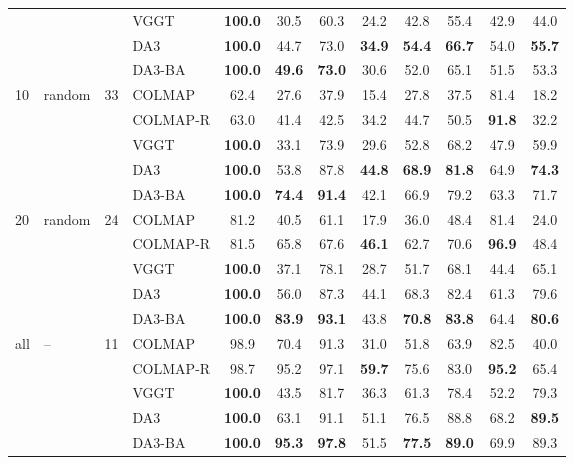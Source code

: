 \begin{tabular}{llr lcccccccc}
 & &  & VGGT & \textbf{100.0} & 30.5 & 60.3 & 24.2 & 42.8 & 55.4 & 42.9 & 44.0 \\
 & &  & DA3 & \textbf{100.0} & 44.7 & 73.0 & \textbf{34.9} & \textbf{54.4} & \textbf{66.7} & 54.0 & \textbf{55.7} \\
 & &  & DA3-BA & \textbf{100.0} & \textbf{49.6} & \textbf{73.0} & 30.6 & 52.0 & 65.1 & 51.5 & 53.3 \\
\midrule
\multirow{5}{*}{10} & \multirow{5}{*}{random} & \multirow{5}{*}{33} & COLMAP & 62.4 & 27.6 & 37.9 & 15.4 & 27.8 & 37.5 & 81.4 & 18.2 \\
 & &  & COLMAP-R & 63.0 & 41.4 & 42.5 & 34.2 & 44.7 & 50.5 & \textbf{91.8} & 32.2 \\
 & &  & VGGT & \textbf{100.0} & 33.1 & 73.9 & 29.6 & 52.8 & 68.2 & 47.9 & 59.9 \\
 & &  & DA3 & \textbf{100.0} & 53.8 & 87.8 & \textbf{44.8} & \textbf{68.9} & \textbf{81.8} & 64.9 & \textbf{74.3} \\
 & &  & DA3-BA & \textbf{100.0} & \textbf{74.4} & \textbf{91.4} & 42.1 & 66.9 & 79.2 & 63.3 & 71.7 \\
\midrule
\multirow{5}{*}{20} & \multirow{5}{*}{random} & \multirow{5}{*}{24} & COLMAP & 81.2 & 40.5 & 61.1 & 17.9 & 36.0 & 48.4 & 81.4 & 24.0 \\
 & &  & COLMAP-R & 81.5 & 65.8 & 67.6 & \textbf{46.1} & 62.7 & 70.6 & \textbf{96.9} & 48.4 \\
 & &  & VGGT & \textbf{100.0} & 37.1 & 78.1 & 28.7 & 51.7 & 68.1 & 44.4 & 65.1 \\
 & &  & DA3 & \textbf{100.0} & 56.0 & 87.3 & 44.1 & 68.3 & 82.4 & 61.3 & 79.6 \\
 & &  & DA3-BA & \textbf{100.0} & \textbf{83.9} & \textbf{93.1} & 43.8 & \textbf{70.8} & \textbf{83.8} & 64.4 & \textbf{80.6} \\
\midrule
\multirow{5}{*}{all} & \multirow{5}{*}{--} & \multirow{5}{*}{11} & COLMAP & 98.9 & 70.4 & 91.3 & 31.0 & 51.8 & 63.9 & 82.5 & 40.0 \\
 & &  & COLMAP-R & 98.7 & 95.2 & 97.1 & \textbf{59.7} & 75.6 & 83.0 & \textbf{95.2} & 65.4 \\
 & &  & VGGT & \textbf{100.0} & 43.5 & 81.7 & 36.3 & 61.3 & 78.4 & 52.2 & 79.3 \\
 & &  & DA3 & \textbf{100.0} & 63.1 & 91.1 & 51.1 & 76.5 & 88.8 & 68.2 & \textbf{89.5} \\
 & &  & DA3-BA & \textbf{100.0} & \textbf{95.3} & \textbf{97.8} & 51.5 & \textbf{77.5} & \textbf{89.0} & 69.9 & 89.3 \\
\bottomrule
\end{tabular}
